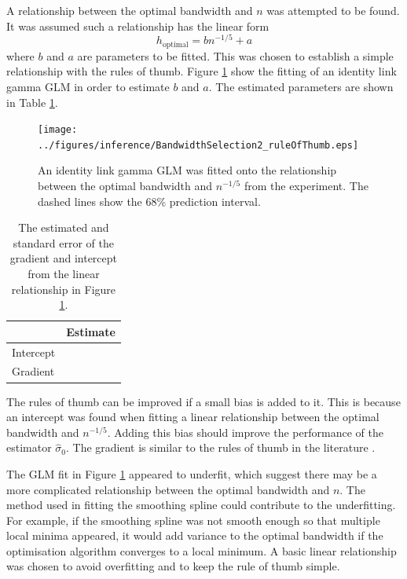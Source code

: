 A relationship between the optimal bandwidth and $n$ was attempted to be found. It was assumed such a relationship has the linear form
\begin{equation}
  h_{\text{optimal}} = b n^{-1/5} + a
\end{equation}
where $b$ and $a$ are parameters to be fitted. This was chosen to establish a simple relationship with the rules of thumb. Figure \ref{fig:inference_BandwidthSelection2_ruleOfThumb} show the fitting of an identity link gamma GLM in order to estimate $b$ and $a$. The estimated parameters are shown in Table \ref{table:inference_BandwidthSelection2_ruleOfThumb}.

\begin{figure}
  \centering
  \texttt{[image: ../figures/inference/BandwidthSelection2\_ruleOfThumb.eps]}
  \caption{An identity link gamma GLM was fitted onto the relationship between the optimal bandwidth and $n^{-1/5}$ from the experiment. The dashed lines show the 68\% prediction interval.}
  \label{fig:inference_BandwidthSelection2_ruleOfThumb}
\end{figure}

\begin{table}
  \centering
  \begin{tabular}{l|c}
           &Estimate \\ \hline
  Intercept&\\
  Gradient &
  \end{tabular}
  \caption{The estimated and standard error of the gradient and intercept from the linear relationship in Figure \ref{fig:inference_BandwidthSelection2_ruleOfThumb}.}
  \label{table:inference_BandwidthSelection2_ruleOfThumb}
\end{table}

The rules of thumb can be improved if a small bias is added to it. This is because an intercept was found when fitting a linear relationship between the optimal bandwidth and $n^{-1/5}$. Adding this bias should improve the performance of the estimator $\widehat{\sigma}_0$. The gradient is similar to the rules of thumb in the literature \citep{sheather2004density}.

The GLM fit in Figure \ref{fig:inference_BandwidthSelection2_ruleOfThumb} appeared to underfit, which suggest there may be a more complicated relationship between the optimal bandwidth and $n$. The method used in fitting the smoothing spline could contribute to the underfitting. For example, if the smoothing spline was not smooth enough so that multiple local minima appeared, it would add variance to the optimal bandwidth if the optimisation algorithm converges to a local minimum. A basic linear relationship was chosen to avoid overfitting and to keep the rule of thumb simple.

